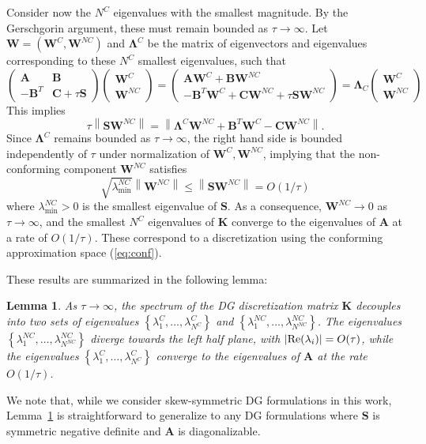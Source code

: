 \documentclass[10pt]{article}
\newcommand{\nor}[1]{\left\| #1 \right\|}
\newcommand{\LRb}[1]{\left| #1 \right|}
\newcommand{\LRc}[1]{\left\{ #1 \right\}}
\newtheorem{lemma}[theorem]{Lemma}
\begin{document}
Consider now the $N^C$ eigenvalues with the smallest magnitude.  By the Gerschgorin argument, these must remain bounded as $\tau \rightarrow \infty$.  Let $\bm{W} = (\bm{W}^C,\bm{W}^{NC})$ and $\bm{\Lambda}^C$ be the matrix of eigenvectors and eigenvalues corresponding to these $N^C$ smallest eigenvalues, such that
\[
\left(\begin{array}{cc}
\bm{A} & \bm{B}\\
-\bm{B}^T & \bm{C} + \tau \bm{S}
\end{array}\right)
\left(\begin{array}{c}
\bm{W}^C
\\
\bm{W}^{NC}
\end{array}\right) = 
\left(\begin{array}{c}
\bm{A}\bm{W}^C + \bm{B}\bm{W}^{NC}\\
-\bm{B}^T\bm{W}^C + \bm{C}\bm{W}^{NC} + \tau \bm{S}\bm{W}^{NC}
\end{array}\right)
= 
\bm{\Lambda}_C
\left(\begin{array}{c}
\bm{W}^C
\\
\bm{W}^{NC}
\end{array}\right) 
\]
This implies 
\[
\tau \nor{\bm{S}\bm{W}^{NC}} = \nor{\bm{\Lambda}^C \bm{W}^{NC} + \bm{B}^T\bm{W}^C  - \bm{C}\bm{W}^{NC}}.
\]
Since $\bm{\Lambda}^C$ remains bounded as $\tau\rightarrow \infty$, the right hand side is bounded independently of $\tau$ under normalization of $\bm{W}^C,\bm{W}^{NC}$, implying that the non-conforming component $\bm{W}^{NC}$ satisfies
\[
\sqrt{\lambda^{NC}_{\min}}\nor{\bm{W}^{NC}} \leq \nor{\bm{S}\bm{W}^{NC}} = O(1/\tau)
\]
where $\lambda^{NC}_{\min} > 0$ is the smallest eigenvalue of $\bm{S}$.  As a consequence, $\bm{W}^{NC} \rightarrow 0$ as $\tau\rightarrow \infty$, and the smallest $N^C$ eigenvalues of $\bm{K}$ converge to the eigenvalues of $\bm{A}$ at a rate of $O(1/\tau)$.  These correspond to a discretization using the conforming approximation space (\ref{eq:conf}). 

These results are summarized in the following lemma:
\begin{lemma}
As $\tau \rightarrow \infty$, the spectrum of the DG discretization matrix $\bm{K}$ decouples into two sets of eigenvalues $\LRc{\lambda^C_1,\ldots,\lambda^C_{N^C}}$ and $\LRc{\lambda^{NC}_1,\ldots,\lambda^{NC}_{N^{NC}}}$.  The eigenvalues $\LRc{\lambda^{NC}_1,\ldots,\lambda^{NC}_{N^{NC}}}$ diverge towards the left half plane, with $\LRb{{\rm Re}(\lambda_i)} = O(\tau)$, while  the eigenvalues $\LRc{\lambda^C_1,\ldots,\lambda^C_{N^C}}$ converge to the eigenvalues of $\bm{A}$ at the rate $O(1/\tau)$.  
\label{lemma:eig}
\end{lemma}
We note that, while we consider skew-symmetric DG formulations in this work, Lemma~\ref{lemma:eig} is straightforward to generalize to any DG formulations where $\bm{S}$ is symmetric negative definite and $\bm{A}$ is diagonalizable.  
\end{document}
